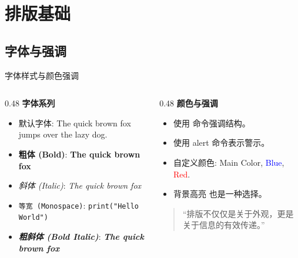 \section{排版基础}

\subsection{字体与强调}
\begin{frame}{字体样式与颜色强调}
  \begin{columns}[T]
    \begin{column}{0.48\textwidth}
      \textbf{\color{main} 字体系列}
      \begin{itemize}
        \item 默认字体: The quick brown fox jumps over the lazy dog.
        \item \textbf{粗体 (Bold)}: \textbf{The quick brown fox}
        \item \textit{斜体 (Italic)}: \textit{The quick brown fox}
        \item \texttt{等宽 (Monospace)}: \texttt{print("Hello World")}
        \item \textbf{\textit{粗斜体 (Bold Italic)}}:
          \textbf{\textit{The quick brown fox}}
      \end{itemize}
    \end{column}
    \begin{column}{0.48\textwidth}
      \textbf{\color{main} 颜色与强调}
      \begin{itemize}
        \item 使用  命令强调结构。
        \item 使用 \alert{alert} 命令表示警示。
        \item 自定义颜色: \textcolor{main}{Main Color},
          \textcolor{blue}{Blue}, \textcolor{red}{Red}.
        \item \colorbox{sustech!15}{背景高亮} 也是一种选择。
      \end{itemize}
      \vspace{1em}
      \begin{quote}
        ``排版不仅仅是关于外观，更是关于信息的有效传递。''
      \end{quote}
    \end{column}
  \end{columns}
\end{frame}

